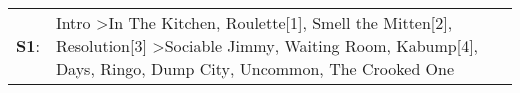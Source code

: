 \begin{supertabular}{p{0.03\textwidth}p{0.92\textwidth}}
 \textbf{S1}:  &  Intro\textsuperscript{} \textgreater \enspace In The Kitchen\textsuperscript{}, \enspace Roulette[1]\textsuperscript{}, \enspace Smell the Mitten[2]\textsuperscript{}, \enspace Resolution[3]\textsuperscript{} \textgreater \enspace Sociable Jimmy\textsuperscript{}, \enspace Waiting Room\textsuperscript{}, \enspace Kabump[4]\textsuperscript{},  Days\textsuperscript{}, \enspace Ringo\textsuperscript{}, \enspace Dump City\textsuperscript{}, \enspace Uncommon\textsuperscript{}, \enspace The Crooked One\textsuperscript{}  \enspace  \\
\end{supertabular}
